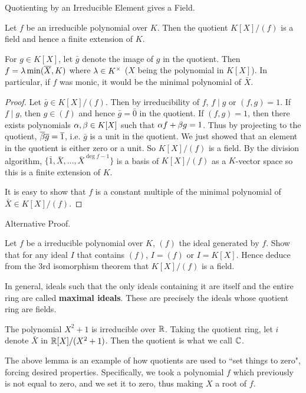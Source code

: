 \documentclass[../book.tex]{subfiles}
\begin{document}
\begin{lem} Quotienting by an Irreducible Element gives a Field. 

    Let $f$ be an irreducible polynomial over $K$. 
    Then the quotient $K[X]/(f)$ is a field and hence a finite extension of $K$. 
    
    For $g \in K[X]$, let $\bar{g}$ denote the image of $g$ in the quotient.
    Then $f = \lambda \min(\overline{X},K)$ where $\lambda \in K^\times$ 
    ($X$ being the polynomial in $K[X]$). 
    In particular, if $f$ was monic, it would be the minimal polynomial of $\bar{X}$.
\end{lem}
\begin{proof}
    Let $\bar{g} \in K[X]/(f)$. 
    Then by irreducibility of $f$, $f \mid g$ or $(f,g) = 1$. 
    If $f \mid g$, then $g \in (f)$ and hence $\bar{g} = \bar{0}$ in the quotient.
    If $(f, g) = 1$, then there exists polynomials $\alpha, \beta \in K[X]$ 
    such that $\alpha f + \beta g = 1$. 
    Thus by projecting to the quotient, $\overline{\beta}\overline{g} = \overline{1}$, 
    i.e. $\bar{g}$ is a unit in the quotient. 
    We just showed that an element in the quotient is either zero or a unit.
    So $K[X]/(f)$ is a field. 
    By the division algorithm, $\{\bar{1}, \bar{X}, \dots, \bar{X}^{\deg f - 1}\}$
    is a basis of $K[X]/(f)$ as a $K$-vector space
    so this is a finite extension of $K$. 
    
    It is easy to show that $f$ is a constant multiple of
    the minimal polynomial of $\bar{X} \in K[X]/(f)$. 
\end{proof}
\begin{ex} Alternative Proof. 
    
    Let $f$ be a irreducible polynomial over $K$, $(f)$ the ideal generated by $f$. 
    Show that for any ideal $I$ that contains $(f)$, $I = (f)$ or $I = K[X]$.
    Hence deduce from the 3rd isomorphism theorem that $K[X]/(f)$ is a field.
    
    In general, ideals such that the only ideals containing it are
    itself and the entire ring are called \textbf{maximal ideals}.
    These are precisely the ideals whose quotient ring are fields. 
\end{ex}
\begin{eg}
    The polynomial $X^2 + 1$ is irreducible over $\mathbb{R}$.
    Taking the quotient ring, let $i$ denote $\bar{X}$ in $\mathbb{R}[X]/(X^2 + 1)$. 
    Then the quotient is what we call $\mathbb{C}$. 
\end{eg}
\begin{rmk}
    The above lemma is an example of how quotients are used to ``set things to zero",
    forcing desired properties.
    Specifically, we took a polynomial $f$ which previously is not equal to zero,
    and we set it to zero, thus making $X$ a root of $f$. 
\end{rmk}
\end{document}
